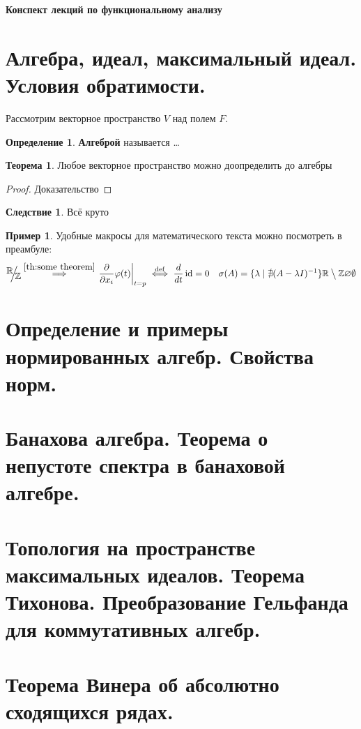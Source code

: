 \documentclass[12pt]{extarticle}
\renewcommand{\setminus}{\mathbin{\big\backslash}}%
\theoremstyle{definition}
\newtheorem{theorem}{\indent Теорема}[section]
\newtheorem{corollary}{\indent Следствие}%
\newtheorem{definition}{\indent Определение}[section]
\newtheorem{example}{\indent Пример}%
\newcommand{\factor}[2]{\raisebox{.3em}{$#1$}\kern-.3em\Big/\kern-.3em\raisebox{-.3em}{$#2$}}
\newcommand{\RR}{\mathbb{R}}
\newcommand{\ZZ}{\mathbb{Z}}
\newcommand{\bb}[1]{\mathbb{#1}}
\newcommand{\implby}[1]{\stackrel{\mathrm{#1}}{\implies}}
\newcommand{\ddt}{\frac{d}{dt}}
\newcommand{\iffdef}{\stackrel{\mathrm{def}}{\iff}}
\newcommand{\at}[2]{\left.#1\right\vert_{#2}}
\newcommand{\partiald}[2]{\frac{\partial #1}{\partial #2}}
\DeclareMathOperator{\id}{id}
\begin{document}
    \begin{titlepage}
        \null
        \vfill
        \centering\Huge\bfseries Конспект лекций по функциональному анализу
        \vfill
        \null
    \end{titlepage}
    \tableofcontents
    \newpage
    \section{Алгебра, идеал, максимальный идеал. Условия обратимости.}
    Рассмотрим векторное пространство $V$ над полем $F$.
    \begin{definition}
        \textbf{Алгеброй} называется \dots
    \end{definition}
    \begin{theorem}\label{th:some theorem}
        Любое векторное пространство можно доопределить до алгебры
    \end{theorem}
    \begin{proof}
        Доказательство
    \end{proof}
    \begin{corollary}
        Всё круто
    \end{corollary}
    \begin{example}
        Удобные макросы для математического текста можно посмотреть в преамбуле:
        $$
        \factor{\RR}{\bb Z} \implby{\ref{th:some theorem}} \at{\partiald{}{x_i}\varphi(t)}{t=p} \iffdef \ddt\id=0 \quad \sigma(A) = \{\lambda\mid\nexists(A-\lambda I)^{-1}\} \RR\setminus\ZZ \varnothing \emptyset
        $$
    \end{example}
    \section{Определение и примеры нормированных алгебр. Свойства норм.}

    \section{Банахова алгебра. Теорема о непустоте спектра в банаховой алгебре.}

    \section{Топология на пространстве максимальных идеалов. Теорема Тихонова. Преобразование Гельфанда для коммутативных алгебр.}

    \section{Теорема Винера об абсолютно сходящихся рядах.}
\end{document}
